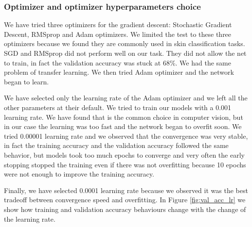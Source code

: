 		\subsubsection{Optimizer and optimizer hyperparameters choice}
			
			We have tried three optimizers for the gradient descent: Stochastic Gradient Descent, RMSprop and Adam optimizers. We limited the test to these three optimizers because we found they are commonly used in skin classification tasks. SGD and RMSprop did not perform well on our task. They did not allow the net to train, in fact the validation accuracy was stuck at 68\%. We had the same problem of transfer learning. We then tried Adam optimizer and the network began to learn.
			
			\smallskip
			
			We have selected only the learning rate of the Adam optimizer and we left all the other parameters at their default. We tried to train our models with a 0.001 learning rate. We have found that is the common choice in computer vision, but in our case the learning was too fast and the network began to overfit soon. We tried 0.00001 learning rate and we observed that the convergence was very stable, in fact the training accuracy and the validation accuracy followed the same behavior, but models took too much epochs to converge and very often the early stopping stopped the training even if there was not overfitting because 10 epochs were not enough to improve the training accuracy.
			
			\smallskip
			
			Finally, we have selected 0.0001 learning rate because we observed it was the best tradeoff between convergence speed and overfitting.
			In Figure \ref{fig:val_acc_lr} we show how training and validation accuracy behaviours change with the change of the learning rate.
			
